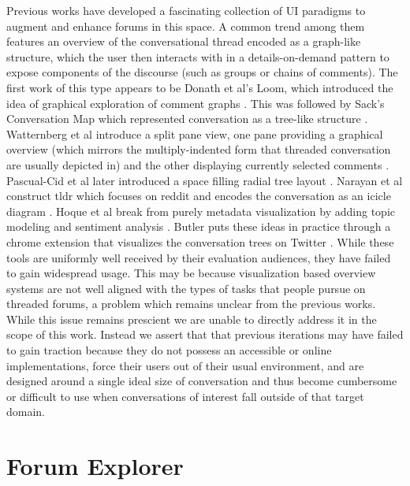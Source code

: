 \documentclass{egpubl}
\begin{document}
Previous works have developed a fascinating collection of UI paradigms to augment and enhance forums in this space. 
%
A common trend among them features an overview of the conversational thread encoded as a graph-like structure, which the user then interacts with in a details-on-demand \cite{shneiderman1996eyes} pattern to expose components of the discourse (such as groups or chains of comments). 
%
 The first work of this type appears to be Donath et al's Loom, which introduced the idea of graphical exploration of comment graphs \cite{donath1999visualizing}. 
 This was followed by Sack's Conversation Map which represented conversation as a tree-like structure \cite{sack2000conversation}. 
 Watternberg et al introduce a split pane view, one pane providing a graphical overview (which mirrors the multiply-indented form that threaded conversation are usually depicted in) and the other displaying currently selected comments \cite{wattenberg2003conversation, dave2004flash}.
% 
Pascual-Cid et al later introduced a space filling radial tree layout \cite{pascual2009exploring}. 
%
Narayan et al construct tldr which focuses on reddit and encodes the conversation as an icicle diagram \cite{narayan2010not}. 
%
Hoque et al break from purely metadata visualization by adding topic modeling and sentiment analysis  \cite{hoque2014convis, hoque2016interactive}.
%
Butler puts these ideas in practice through a chrome extension that visualizes the conversation trees on Twitter \cite{treeverse}.
%
While these tools are uniformly well received by their evaluation audiences, they have failed to gain widespread usage.
%
This may be because visualization based overview systems are not well aligned with the types of tasks that people pursue on threaded forums, a problem which remains unclear from the previous works.
%
While this issue remains prescient we are unable to directly address it in the scope of this work.
%
Instead we assert that that previous iterations may have failed to gain traction because they do not possess an accessible or online implementations, force their users out of their usual environment, and are designed around a single ideal size of conversation and thus become cumbersome or difficult to use when conversations of interest fall outside of that target domain.






\section{Forum Explorer}
\end{document}
